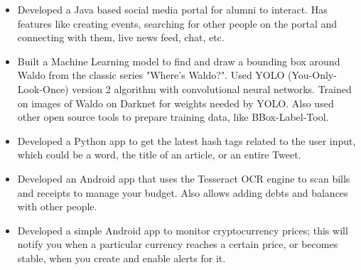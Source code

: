\documentclass[]{deedy-resume-openfont}
\begin{document}
\begin{minipage}[]{1\textwidth}
\begin{tightemize}
\begin{itemize}
\end{itemize}
\item {}
\begin{itemize}
\item \normalsize Developed a Java based social media portal for alumni to interact. Has features like creating events, searching for other people on the portal and connecting with them, live news feed, chat, etc.
\end{itemize}
\item {}
\begin{itemize}
\item \normalsize Built a Machine Learning model to find and draw a bounding box around Waldo from the classic series "Where's Waldo?". Used YOLO (You-Only-Look-Once) version 2 algorithm with convolutional neural networks. Trained on images of Waldo on Darknet for weights needed by YOLO. Also used other open source tools to prepare training data, like BBox-Label-Tool.
\end{itemize}
\item {}
\begin{itemize}
\item \normalsize Developed a Python app to get the latest hash tags related to the user input, which could be a word, the title of an article, or an entire Tweet.
\end{itemize}
\item {}
\begin{itemize}
\item \normalsize Developed an Android app that uses the Tesseract OCR engine to scan bills and receipts to manage your budget. Also allows adding debts and balances with other people.
\end{itemize}
\item {}
\begin{itemize}
\item \normalsize Developed a simple Android app to monitor cryptocurrency prices; this will notify you when a particular currency reaches a certain price, or becomes stable, when you create and enable alerts for it.
\end{itemize}
\end{tightemize}
\sectionsep


\end{minipage}
\end{document}
